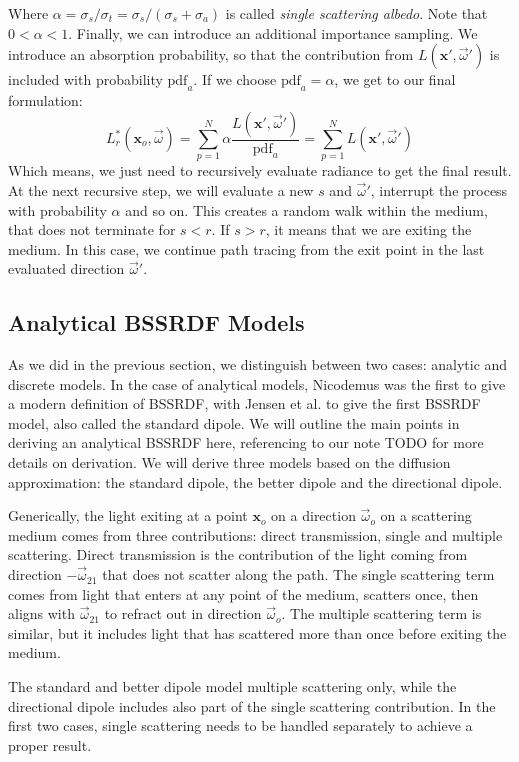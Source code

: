 Where $\alpha = \sigma_s / \sigma_t = \sigma_s / (\sigma_s + \sigma_a)  $ is called \emph{single scattering albedo}. Note that $0 < \alpha < 1$.  Finally, we can introduce an additional importance sampling. We introduce an absorption probability, so that the contribution from $L(\mathbf{x}', \vec{\omega}')$ is included with probability $\text{pdf}_a$. If we choose $\text{pdf}_a = \alpha$, we get to our final formulation:
$$
L_r^*(\mathbf{x}_o, \vec{\omega}) = \sum_{p=1}^N \alpha \frac{L(\mathbf{x}', \vec{\omega}')} {\text{pdf}_a} = \sum_{p=1}^N  L(\mathbf{x}', \vec{\omega}') 
$$
Which means, we just need to recursively evaluate radiance to get the final result. At the next recursive step, we will evaluate a new $s$ and $\vec{\omega}'$, interrupt the process with probability $\alpha$ and so on. This creates a random walk within the medium, that does not terminate for $s < r$. If $s > r$, it means that we are exiting the medium. In this case, we continue path tracing from the exit point in the last evaluated direction $\vec{\omega}'$.

\subsection{Analytical BSSRDF Models}
As we did in the previous section, we distinguish between two cases: analytic and discrete models. In the case of analytical models, Nicodemus was the first to give a modern definition of BSSRDF, with Jensen et al. to give the first BSSRDF model, also called the standard dipole. We will outline the main points in deriving an analytical BSSRDF here, referencing to our note TODO for more details on derivation. We will derive three models based on the diffusion approximation: the standard dipole, the better dipole and the directional dipole.

Generically, the light exiting at a point $\mathbf{x}_o$ on a direction $\vec{\omega}_o$ on a scattering medium comes from three contributions: direct transmission, single and multiple scattering. Direct transmission is the contribution of the light coming from direction $-\vec{\omega}_{21}$ that does not scatter along the path. The single scattering term comes from light that enters at any point of the medium, scatters once, then aligns with $\vec{\omega}_{21}$ to refract out in direction $\vec{\omega}_o$. The multiple scattering term is similar, but it includes light that has scattered more than once before exiting the medium. 

The standard and better dipole model multiple scattering only, while the directional dipole includes also part of the single scattering contribution. In the first two cases, single scattering needs to be handled separately to achieve a proper result. 

